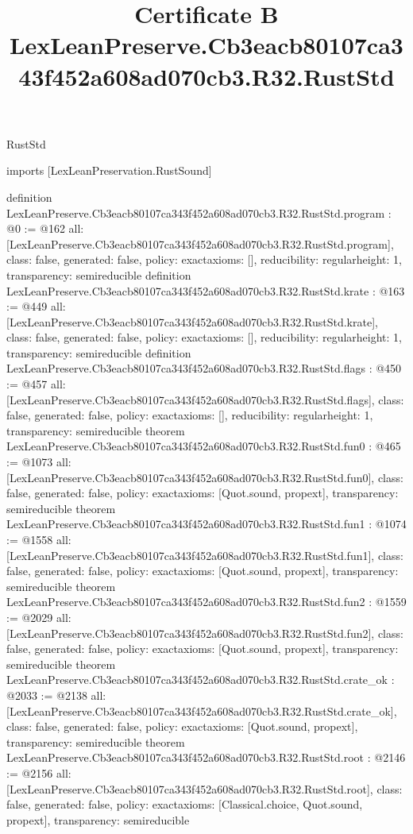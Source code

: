 \begin{lexlean}{RustStd}
\title{Certificate B LexLeanPreserve.Cb3eacb80107ca343f452a608ad070cb3.R32.RustStd}
\begin{coremodule}
imports [LexLeanPreservation.RustSound]

definition LexLeanPreserve.Cb3eacb80107ca343f452a608ad070cb3.R32.RustStd.program : @0 := @162 {
  all: [LexLeanPreserve.Cb3eacb80107ca343f452a608ad070cb3.R32.RustStd.program],
  class: false,
  generated: false,
  policy: exact{axioms: []},
  reducibility: regular{height: 1},
  transparency: semireducible
}
definition LexLeanPreserve.Cb3eacb80107ca343f452a608ad070cb3.R32.RustStd.krate : @163 := @449 {
  all: [LexLeanPreserve.Cb3eacb80107ca343f452a608ad070cb3.R32.RustStd.krate],
  class: false,
  generated: false,
  policy: exact{axioms: []},
  reducibility: regular{height: 1},
  transparency: semireducible
}
definition LexLeanPreserve.Cb3eacb80107ca343f452a608ad070cb3.R32.RustStd.flags : @450 := @457 {
  all: [LexLeanPreserve.Cb3eacb80107ca343f452a608ad070cb3.R32.RustStd.flags],
  class: false,
  generated: false,
  policy: exact{axioms: []},
  reducibility: regular{height: 1},
  transparency: semireducible
}
theorem LexLeanPreserve.Cb3eacb80107ca343f452a608ad070cb3.R32.RustStd.fun0 : @465 := @1073 {
  all: [LexLeanPreserve.Cb3eacb80107ca343f452a608ad070cb3.R32.RustStd.fun0],
  class: false,
  generated: false,
  policy: exact{axioms: [Quot.sound, propext]},
  transparency: semireducible
}
theorem LexLeanPreserve.Cb3eacb80107ca343f452a608ad070cb3.R32.RustStd.fun1 : @1074 := @1558 {
  all: [LexLeanPreserve.Cb3eacb80107ca343f452a608ad070cb3.R32.RustStd.fun1],
  class: false,
  generated: false,
  policy: exact{axioms: [Quot.sound, propext]},
  transparency: semireducible
}
theorem LexLeanPreserve.Cb3eacb80107ca343f452a608ad070cb3.R32.RustStd.fun2 : @1559 := @2029 {
  all: [LexLeanPreserve.Cb3eacb80107ca343f452a608ad070cb3.R32.RustStd.fun2],
  class: false,
  generated: false,
  policy: exact{axioms: [Quot.sound, propext]},
  transparency: semireducible
}
theorem LexLeanPreserve.Cb3eacb80107ca343f452a608ad070cb3.R32.RustStd.crate_ok : @2033 := @2138 {
  all: [LexLeanPreserve.Cb3eacb80107ca343f452a608ad070cb3.R32.RustStd.crate_ok],
  class: false,
  generated: false,
  policy: exact{axioms: [Quot.sound, propext]},
  transparency: semireducible
}
theorem LexLeanPreserve.Cb3eacb80107ca343f452a608ad070cb3.R32.RustStd.root : @2146 := @2156 {
  all: [LexLeanPreserve.Cb3eacb80107ca343f452a608ad070cb3.R32.RustStd.root],
  class: false,
  generated: false,
  policy: exact{axioms: [Classical.choice, Quot.sound, propext]},
  transparency: semireducible
}


\end{coremodule}
\end{lexlean}
